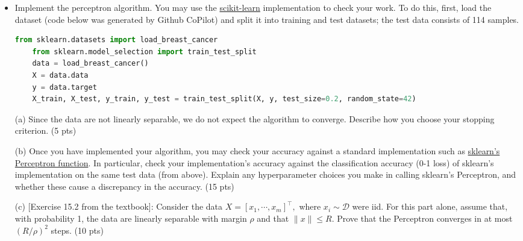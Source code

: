 \documentclass[12pt]{article}
\begin{document}
\begin{itemize}
	\item Implement the perceptron algorithm. You may use the \href{https://scikit-learn.org/stable/modules/generated/sklearn.linear_model.Perceptron.html}{scikit-learn} implementation to check your work. To do this, first, load the dataset (code below was generated by Github CoPilot) and split it into training and test datasets; the test data consists of 114 samples.
	\begin{lstlisting}[language=Python]
	from sklearn.datasets import load_breast_cancer
	from sklearn.model_selection import train_test_split
	data = load_breast_cancer()
	X = data.data
	y = data.target
	X_train, X_test, y_train, y_test = train_test_split(X, y, test_size=0.2, random_state=42)
	\end{lstlisting}
	\item[(a)] Since the data are not linearly separable, we do not expect the algorithm to converge. Describe how you choose your stopping criterion. (5 pts)
	\item[(b)] Once you have implemented your algorithm, you may check your accuracy against a standard implementation such as \href{https://scikit-learn.org/stable/modules/generated/sklearn.linear_model.Perceptron.html}{sklearn's Perceptron function}. In particular, check your implementation's accuracy against the classification accuracy (0-1 loss) of sklearn's implementation on the same test data (from above). Explain any hyperparameter choices you make in calling sklearn's Perceptron, and whether these cause a discrepancy in the accuracy. (15 pts)
	\item[(c)] [Exercise 15.2 from the textbook]: 
		Consider the data $X = [x_1,\cdots, x_m]^\top,$ where $x_i \sim \mathcal{D}$ were iid. For this part alone, assume that, with probability 1, the data are linearly separable with margin $\rho$ and that $\|x\|\leq R$. Prove that the Perceptron converges in at most $(R/\rho)^2$ steps. (10 pts)
	

\end{itemize}
\end{document}
